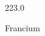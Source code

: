 \documentclass[12pt]{article}
\begin{document}
\hfill{}
\vfill
\begin{center}
  {\fontsize{50}{60}
  }

  \vspace{1em}

  223.0

Francium
\end{center}
\vfill
\end{document}

